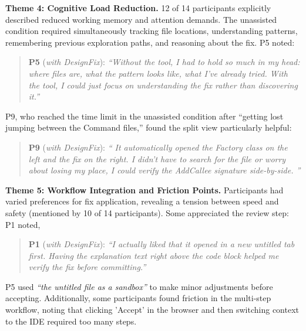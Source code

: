 \documentclass[conference]{IEEEtran}
\newcommand{\pquote}[3]{%
\vspace{2pt}
\begin{quote}\small
\textbf{#1} (\emph{#2}): \emph{``#3''}
\end{quote}
\vspace{2pt}
}
\begin{document}
\textbf{Theme 4: Cognitive Load Reduction.} 12 of 14 participants explicitly described reduced working memory and attention demands. The unassisted condition required simultaneously tracking file locations, understanding patterns, remembering previous exploration paths, and reasoning about the fix. P5 noted:
\pquote{P5}{with DesignFix}{Without the tool, I had to hold so much in my head: where files are, what the pattern looks like, what I've already tried. With the tool, I could just focus on understanding the fix rather than discovering it.}


P9, who reached the time limit in the unassisted condition after ``getting lost jumping between the Command files,'' found the split view particularly helpful: 
\pquote{P9}{with DesignFix}{
It automatically opened the Factory class on the left and the fix on the right. I didn't have to search for the file or worry about losing my place, I could verify the AddCallee signature side-by-side.
}



\textbf{Theme 5: Workflow Integration and Friction Points.} Participants had varied preferences for fix application, revealing a tension between speed and safety (mentioned by 10 of 14 participants). Some appreciated the review step: P1 noted, 
\pquote{P1}{with DesignFix}{I actually liked that it opened in a new untitled tab first. Having the explanation text right above the code block helped me verify the fix before committing.}


P5 used \textit{``the untitled file as a sandbox''} to make minor adjustments before accepting. Additionally, some participants found friction in the multi-step workflow, noting that clicking 'Accept' in the browser and then switching context to the IDE required too many steps.
\end{document}
